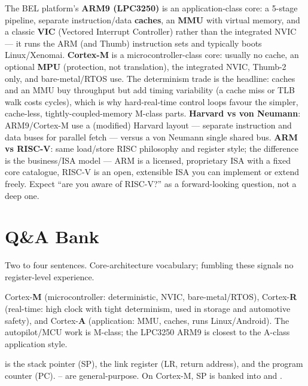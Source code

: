 The BEL platform's \textbf{ARM9 (LPC3250)} is an application-class core: a
5-stage pipeline, separate instruction/data \textbf{caches}, an \textbf{MMU}
with virtual memory, and a classic \textbf{VIC} (Vectored Interrupt
Controller) rather than the integrated NVIC --- it runs the ARM (and Thumb)
instruction sets and typically boots Linux/Xenomai. \textbf{Cortex-M} is a
microcontroller-class core: usually no cache, an optional \textbf{MPU}
(protection, not translation), the integrated NVIC, Thumb-2 only, and
bare-metal/RTOS use. The determinism trade is the headline: caches and an MMU
buy throughput but add timing variability (a cache miss or TLB walk costs
cycles), which is why hard-real-time control loops favour the simpler,
cache-less, tightly-coupled-memory M-class parts. \textbf{Harvard vs von
Neumann}: ARM9/Cortex-M use a (modified) Harvard layout --- separate
instruction and data buses for parallel fetch --- versus a von Neumann single
shared bus. \textbf{ARM vs RISC-V}: same load/store RISC philosophy and
register style; the difference is the business/ISA model --- ARM is a licensed,
proprietary ISA with a fixed core catalogue, RISC-V is an open, extensible ISA
you can implement or extend freely. Expect ``are you aware of RISC-V?'' as a
forward-looking question, not a deep one.

\section{Q\&A Bank}

%
{Two to four sentences. Core-architecture vocabulary; fumbling these signals
no register-level experience.}

Cortex-\textbf{M} (microcontroller: deterministic, NVIC, bare-metal/RTOS),
Cortex-\textbf{R} (real-time: high clock with tight determinism, used in
storage and automotive safety), and Cortex-\textbf{A} (application: MMU,
caches, runs Linux/Android). The autopilot/MCU work is M-class; the LPC3250
ARM9 is closest to the A-class application style.

 is the stack pointer (SP),  the link register (LR, return
address), and  the program counter (PC). -- are
general-purpose. On Cortex-M, SP is banked into  and .


